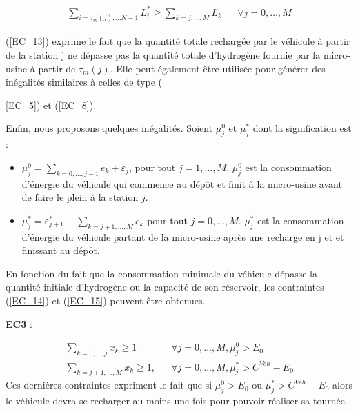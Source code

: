 \begin{equation}
\begin{align}
\label{EC_13}
\sum_{i=\tau_m(j), \dots N-1} L_i^* \geq \sum_{k=j, \dots, M} L_k&  & \forall j = 0, \dots, M
\end{align}
\end{equation}

(\ref{EC_13}) exprime le fait que la quantité totale rechargée par le véhicule à partir de la station j ne dépasse pas la quantité totale d'hydrogène fournie par la micro-usine à partir de $\tau_m(j)$.  Elle peut également être utilisée
pour générer des inégalités similaires à celles de type ({\ref{EC_5}) et (\ref{EC_8}).

Enfin, nous proposons quelques inégalités. Soient $\mu_j^0$ et $\mu_j^*$ dont la signification est : 
\begin{itemize}[label=$\square$]
\item $\mu_j^0= \sum_{k=0, \dots, j-1}e_k + \varepsilon_j$, pour tout $j =1 , \dots, M$. $\mu_j^0$ est la consommation d'énergie du véhicule qui commence au dépôt et finit à la micro-usine avant de faire le plein à la station $j$.
\item  $\mu_j^*= \varepsilon_{j+1}^* + \sum_{k=j+1, \dots, M} e_k$ pour tout $j = 0 , \dots, M$.
$\mu_j^*$ est la consommation d'énergie du véhicule partant de la micro-usine après une recharge en j et
et finissant au dépôt.
\end{itemize}
En fonction du fait que la consommation minimale du véhicule dépasse la quantité initiale d'hydrogène ou la capacité de son réservoir, les contraintes (\ref{EC_14}) et (\ref{EC_15}) peuvent être obtenues.

\textbf{EC3} :

\begin{subequations}
\begin{align}
\label{EC_14}
\sum_{k=0, \dots, j} x_k \geq 1 &  &\forall j = 0, \dots, M, \mu_j^0 > E_0 \\
\label{EC_15}
\sum_{k=j+1, \dots, M} x_k \geq 1, &  &\forall j = 0, \dots, M, \mu_j^* > C^{Veh}-E_0
\end{align}
\end{subequations}
Ces dernières contraintes expriment le fait que si $\mu_j^0 > E_0$ ou $\mu_j^* > C^{Veh}-E_0$ alors le véhicule devra se recharger au moins une fois pour pouvoir réaliser sa tournée.
}
